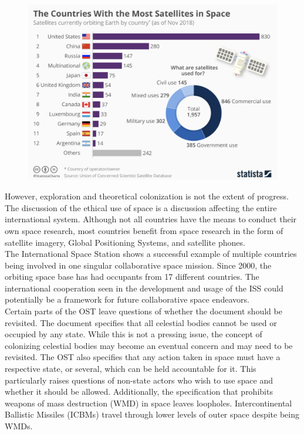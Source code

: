 \documentclass[10pt, letterpaper]{article}
\begin{document}
\begin{figure}
\centering
\includegraphics[scale = 0.35]{image3.png} 
\end{figure}

However, exploration and theoretical colonization is not the extent of
progress. The discussion of the ethical use of space is a discussion
affecting the entire international system. Although not all countries
have the means to conduct their own space research, most countries
benefit from space research in the form of satellite imagery, Global
Positioning Systems, and satellite phones. \\

The International Space Station shows a successful example of multiple
countries being involved in one singular collaborative space mission.
Since 2000, the orbiting space base has had occupants from 17 different
countries. The international cooperation seen in the development and
usage of the ISS could potentially be a framework for future
collaborative space endeavors. \\

Certain parts of the OST leave questions of whether the document should
be revisited. The document specifies that all celestial bodies cannot be
used or occupied by any state. While this is not a pressing issue, the
concept of colonizing celestial bodies may become an eventual concern
and may need to be revisited. The OST also specifies that any action
taken in space must have a respective state, or several, which can be
held accountable for it. This particularly raises questions of non-state
actors who wish to use space and whether it should be allowed.
Additionally, the specification that prohibits weapons of mass
destruction (WMD) in space leaves loopholes. Intercontinental Ballistic
Missiles (ICBMs) travel through lower levels of outer space despite
being WMDs. \\
\newpage
\end{document}
